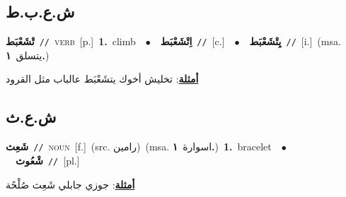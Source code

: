 \documentclass[10pt,a4paper,twoside]{article} %
\begin{document}
\begin{multicols}{2}
\vspace{-3mm}
\subsection*{\color{blue}\foreignlanguage{arabic}{ش.ع.ب.ط}\color{blue}{}} 

{\setlength\topsep{0pt}\textbf{\foreignlanguage{arabic}{تْشَعْبَط}}\ {\color{gray}\texttt{//}\color{black}}\ \textsc{verb}\ [p.]\ \textbf{1.}~climb\ \ $\bullet$\ \ \setlength\topsep{0pt}\textbf{\foreignlanguage{arabic}{اِتْشَعْبَط}}\ {\color{gray}\texttt{//}\color{black}}\ [c.]\ \ $\bullet$\ \ \setlength\topsep{0pt}\textbf{\foreignlanguage{arabic}{يِتْشَعْبَط}}\ {\color{gray}\texttt{//}\color{black}}\ [i.]\ \color{gray}(msa. \foreignlanguage{arabic}{يتسلق}~\foreignlanguage{arabic}{\textbf{١.}})\color{black}\  \begin{flushright}\color{gray}\foreignlanguage{arabic}{\textbf{\underline{\foreignlanguage{arabic}{أمثلة}}}: تخليش أخوك يتشَعْبَط عالباب مثل القرود}\end{flushright}\color{black}} \vspace{2mm}

\vspace{-3mm}
\subsection*{\color{blue}\foreignlanguage{arabic}{ش.ع.ث}\color{blue}{}} 

{\setlength\topsep{0pt}\textbf{\foreignlanguage{arabic}{شَعِث}}\ {\color{gray}\texttt{//}\color{black}}\ \textsc{noun}\ [f.]\ (src. \color{gray}\foreignlanguage{arabic}{رامين}\color{black})\ \color{gray}(msa. \foreignlanguage{arabic}{اسوارة}~\foreignlanguage{arabic}{\textbf{١.}})\color{black}\ \textbf{1.}~bracelet\ \ $\bullet$\ \ \setlength\topsep{0pt}\textbf{\foreignlanguage{arabic}{شْعُوث}}\ {\color{gray}\texttt{//}\color{black}}\ [pl.]\  \begin{flushright}\color{gray}\foreignlanguage{arabic}{\textbf{\underline{\foreignlanguage{arabic}{أمثلة}}}: جوزي جابلي شَعِث صُلْحًة}\end{flushright}\color{black}} \vspace{2mm}


\end{multicols}
\end{document}
